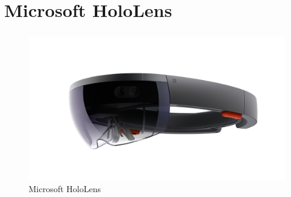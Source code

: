 \documentclass{beamer}
\begin{document}



\section{Microsoft HoloLens}

\begin{frame}
    \frametitle{\insertsection}
    \begin{figure}
        \centering
            \includegraphics[width=.9\linewidth]{images/HoloLens}
            \caption{Microsoft HoloLens~\cite{HoloLens:uH2UA4Mc}}
      \end{figure}
\end{frame}
\end{document}
